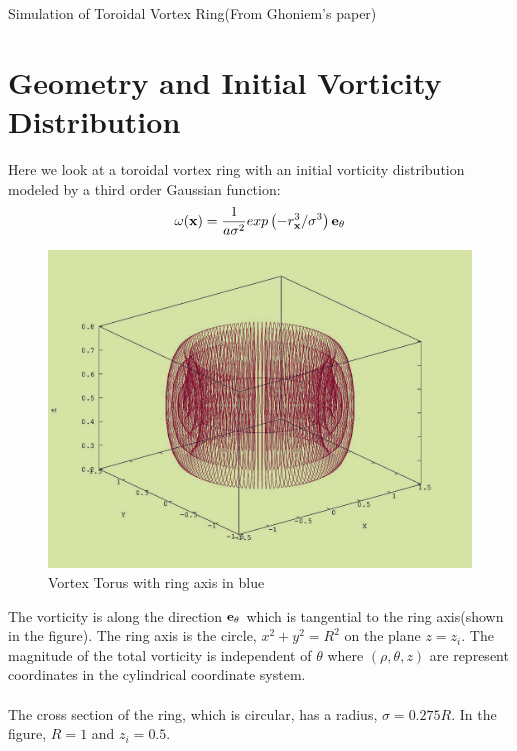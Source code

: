 \documentclass[10pt,a4paper]{report}
\newcommand{\omegav}{{\bf \omega}}
\newcommand{\xv}{{\bf x}}
\newcommand{\et}{{\bf e}_\theta}
\begin{document}
\begin{huge}
Simulation of Toroidal Vortex Ring(From Ghoniem's paper\cite{ghoniem})
\end{huge}
\section{Geometry and Initial Vorticity Distribution}

Here we look at a toroidal vortex ring with an initial vorticity distribution modeled by a third order Gaussian function:
\begin{equation}
\omegav (\xv) = \frac{1}{a\sigma^2} exp\left(-r_\xv^3/\sigma^3\right) \et
\end{equation} 
\begin{figure}
\includegraphics[scale=0.3]{geometry.jpg}
\caption{Vortex Torus with ring axis in blue}
\end{figure}
The vorticity is along the direction $\et$ which is tangential to the ring axis(shown in the figure). The ring axis is the circle, $x^2 + y^2 = R^2$ on the plane $z=z_i$.
The magnitude of the total vorticity is independent of $\theta$ where $(\rho,\theta, z)$ are represent coordinates in the cylindrical coordinate system.
\paragraph{}
The cross section of the ring, which is circular, has a radius, $\sigma = 0.275 R$. In the figure, $R = 1$ and $z_i = 0.5$.
\end{document}
